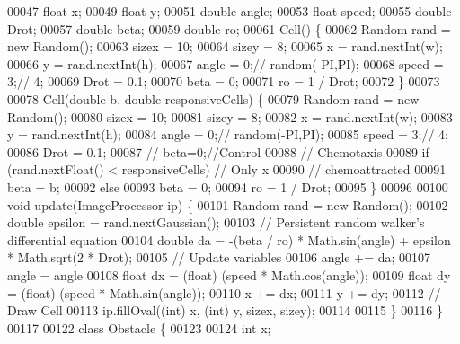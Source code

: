 \begin{DoxyCode}
00047     \textcolor{keywordtype}{float} x;
00049     \textcolor{keywordtype}{float} y;
00051     \textcolor{keywordtype}{double} angle;
00053     \textcolor{keywordtype}{float} speed;
00055     \textcolor{keywordtype}{double} Drot;
00057     \textcolor{keywordtype}{double} beta;
00059     \textcolor{keywordtype}{double} ro;
00061     Cell() \{
00062       Random rand = \textcolor{keyword}{new} Random();
00063       sizex = 10;
00064       sizey = 8;
00065       x = rand.nextInt(w);
00066       y = rand.nextInt(h);
00067       angle = 0;\textcolor{comment}{// random(-PI,PI);}
00068       speed = 3;\textcolor{comment}{// 4;}
00069       Drot = 0.1;
00070       beta = 0;
00071       ro = 1 / Drot;
00072     \}
00073 
00078     Cell(\textcolor{keywordtype}{double} b, \textcolor{keywordtype}{double} responsiveCells) \{
00079       Random rand = \textcolor{keyword}{new} Random();
00080       sizex = 10;
00081       sizey = 8;
00082       x = rand.nextInt(w);
00083       y = rand.nextInt(h);
00084       angle = 0;\textcolor{comment}{// random(-PI,PI);}
00085       speed = 3;\textcolor{comment}{// 4;}
00086       Drot = 0.1;
00087       \textcolor{comment}{// beta=0;//Control}
00088       \textcolor{comment}{// Chemotaxis}
00089       \textcolor{keywordflow}{if} (rand.nextFloat() < responsiveCells) \textcolor{comment}{// Only x%
00090                                               \textcolor{comment}{// chemoattracted}
00091         beta = b;
00092       \textcolor{keywordflow}{else}
00093         beta = 0;
00094       ro = 1 / Drot;
00095     \}
00096 
00100     \textcolor{keywordtype}{void} update(ImageProcessor ip) \{
00101       Random rand = \textcolor{keyword}{new} Random();
00102       \textcolor{keywordtype}{double} epsilon = rand.nextGaussian();
00103       \textcolor{comment}{// Persistent random walker's differential equation}
00104       \textcolor{keywordtype}{double} da = -(beta / ro) * Math.sin(angle) + epsilon * Math.sqrt(2 * Drot);
00105       \textcolor{comment}{// Update variables}
00106       angle += da;
00107       angle = angle %
00108       \textcolor{keywordtype}{float} dx = (float) (speed * Math.cos(angle));
00109       \textcolor{keywordtype}{float} dy = (float) (speed * Math.sin(angle));
00110       x += dx;
00111       y += dy;
00112       \textcolor{comment}{// Draw Cell}
00113       ip.fillOval((\textcolor{keywordtype}{int}) x, (\textcolor{keywordtype}{int}) y, sizex, sizey);
00114 
00115     \}
00116   \}
00117 
00122   \textcolor{keyword}{class }Obstacle \{
00123 
00124     \textcolor{keywordtype}{int} x;
}
\end{DoxyCode}
